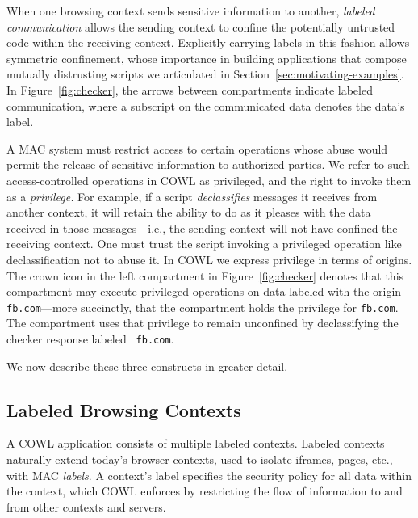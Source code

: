 When one browsing context sends sensitive information to another, {\em
  labeled communication} allows the sending context to confine the
potentially untrusted code within the receiving context. Explicitly
carrying labels in this fashion allows symmetric confinement, whose
importance in building applications that compose mutually distrusting
scripts we articulated in Section~\ref{sec:motivating-examples}. In
Figure~\ref{fig:checker}, the arrows between compartments indicate
labeled communication, where a subscript on the communicated data
denotes the data's label.

A MAC system must restrict access to certain operations whose abuse
would permit the release of sensitive information to authorized
parties. We refer to such access-controlled operations in COWL as
privileged, and the right to invoke them as a {\em privilege.} For
example, if a script {\em declassifies} messages it receives from
another context, it will retain the ability to do as it pleases with
the data received in those messages---i.e., the sending context will
not have confined the receiving context. One must trust the script
invoking a privileged operation like declassification not to abuse
it. In COWL we express privilege in terms of origins. The crown icon
in the left compartment in Figure~\ref{fig:checker} denotes that this
compartment may execute privileged operations on data labeled with the
origin {\tt fb.com}---more succinctly, that the compartment holds the
privilege for {\tt fb.com}. The compartment uses that privilege to
remain unconfined by declassifying the checker response labeled {\tt
  fb.com}.

We now describe these three constructs in greater detail.



\subsection{Labeled Browsing Contexts}
\label{sec:system:contexts}
A COWL application consists of multiple labeled contexts.
%
Labeled contexts naturally extend today's browser contexts, used to
isolate iframes, pages, etc., with MAC \emph{labels}.
%
A context's label specifies the security policy for all data within
the context, which COWL enforces by restricting the flow of
information to and from other contexts and servers.

